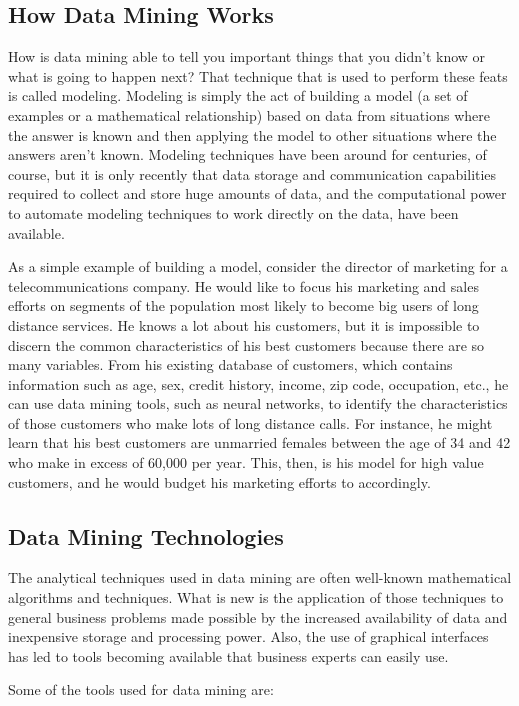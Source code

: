 \subsection{How Data Mining Works}
How is data mining able to tell you important things that you didn't know or what is going to happen next? That technique that is used to perform these feats is called modeling. Modeling is simply the act of building a model (a set of examples or a mathematical relationship) based on data from situations where the answer is known and then applying the model to other situations where the answers aren't known. Modeling techniques have been around for centuries, of course, but it is only recently that data storage and communication capabilities required to collect and store huge amounts of data, and the computational power to automate modeling techniques to work directly on the data, have been available.

As a simple example of building a model, consider the director of marketing for a telecommunications company. He would like to focus his marketing and sales efforts on segments of the population most likely to become big users of long distance services. He knows a lot about his customers, but it is impossible to discern the common characteristics of his best customers because there are so many variables. From his existing database of customers, which contains information such as age, sex, credit history, income, zip code, occupation, etc., he can use data mining tools, such as neural networks, to identify the characteristics of those customers who make lots of long distance calls. For instance, he might learn that his best customers are unmarried females between the age of 34 and 42 who make in excess of 60,000 per year. This, then, is his model for high value customers, and he would budget his marketing efforts to accordingly.

\subsection{Data Mining Technologies}
The analytical techniques used in data mining are often well-known mathematical algorithms and techniques. What is new is the application of those techniques to general business problems made possible by the increased availability of data and inexpensive storage and processing power. Also, the use of graphical interfaces has led to tools becoming available that business experts can easily use.

Some of the tools used for data mining are:

